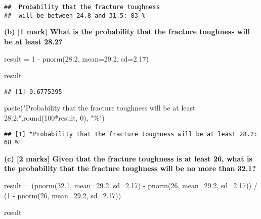 \documentclass[
]{article}
\newenvironment{Shaded}{\begin{snugshade}}{\end{snugshade}}
\newcommand{\AttributeTok}[1]{\textcolor[rgb]{0.77,0.63,0.00}{#1}}
\newcommand{\DecValTok}[1]{\textcolor[rgb]{0.00,0.00,0.81}{#1}}
\newcommand{\FloatTok}[1]{\textcolor[rgb]{0.00,0.00,0.81}{#1}}
\newcommand{\FunctionTok}[1]{\textcolor[rgb]{0.00,0.00,0.00}{#1}}
\newcommand{\NormalTok}[1]{#1}
\newcommand{\OtherTok}[1]{\textcolor[rgb]{0.56,0.35,0.01}{#1}}
\newcommand{\SpecialCharTok}[1]{\textcolor[rgb]{0.00,0.00,0.00}{#1}}
\newcommand{\StringTok}[1]{\textcolor[rgb]{0.31,0.60,0.02}{#1}}
\begin{document}
\begin{verbatim}
##  Probability that the fracture toughness 
##  will be between 24.8 and 31.5: 83 %
\end{verbatim}

\newline
\newline

\textbf{(b) {[}1 mark{]} What is the probability that the fracture
toughness will be at least 28.2?}

\begin{Shaded}
\begin{Highlighting}[]
\NormalTok{result }\OtherTok{=} \DecValTok{1} \SpecialCharTok{{-}} \FunctionTok{pnorm}\NormalTok{(}\FloatTok{28.2}\NormalTok{, }\AttributeTok{mean=}\FloatTok{29.2}\NormalTok{, }\AttributeTok{sd=}\FloatTok{2.17}\NormalTok{)}

\NormalTok{result}
\end{Highlighting}
\end{Shaded}

\begin{verbatim}
## [1] 0.6775395
\end{verbatim}

\begin{Shaded}
\begin{Highlighting}[]
\FunctionTok{paste}\NormalTok{(}\StringTok{"Probability that the fracture toughness will be at least 28.2:"}\NormalTok{,}\FunctionTok{round}\NormalTok{(}\DecValTok{100}\SpecialCharTok{*}\NormalTok{result, }\DecValTok{0}\NormalTok{), }\StringTok{"\%"}\NormalTok{)}
\end{Highlighting}
\end{Shaded}

\begin{verbatim}
## [1] "Probability that the fracture toughness will be at least 28.2: 68 %"
\end{verbatim}

\newline
\newline

\textbf{(c) {[}2 marks{]} Given that the fracture toughness is at least
26, what is the probability that the fracture toughness will be no more
than 32.1?}

\begin{Shaded}
\begin{Highlighting}[]
\NormalTok{result }\OtherTok{=}\NormalTok{ (}\FunctionTok{pnorm}\NormalTok{(}\FloatTok{32.1}\NormalTok{, }\AttributeTok{mean=}\FloatTok{29.2}\NormalTok{, }\AttributeTok{sd=}\FloatTok{2.17}\NormalTok{) }\SpecialCharTok{{-}} \FunctionTok{pnorm}\NormalTok{(}\DecValTok{26}\NormalTok{, }\AttributeTok{mean=}\FloatTok{29.2}\NormalTok{, }\AttributeTok{sd=}\FloatTok{2.17}\NormalTok{)) }\SpecialCharTok{/} 
\NormalTok{         (}\DecValTok{1} \SpecialCharTok{{-}} \FunctionTok{pnorm}\NormalTok{(}\DecValTok{26}\NormalTok{, }\AttributeTok{mean=}\FloatTok{29.2}\NormalTok{, }\AttributeTok{sd=}\FloatTok{2.17}\NormalTok{))}

\NormalTok{result}
\end{Highlighting}
\end{Shaded}
\end{document}
